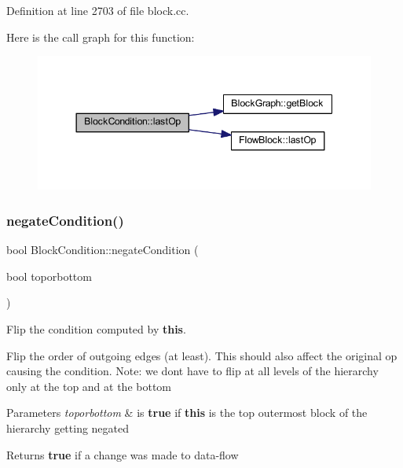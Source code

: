 Definition at line 2703 of file block.\+cc.

Here is the call graph for this function\+:
\nopagebreak
\begin{figure}[H]
\begin{center}
\leavevmode
\includegraphics[width=344pt]{class_block_condition_acfde1060a17a2c40b1cb9edf90e69595_cgraph}
\end{center}
\end{figure}
\mbox{\label{class_block_condition_a2af1221f54ea05c5c8b25b4321f60705}} 
\subsubsection{\texorpdfstring{negateCondition()}{negateCondition()}}
{\footnotesize\ttfamily bool Block\+Condition\+::negate\+Condition (\begin{DoxyParamCaption}\item[{bool}]{toporbottom }\end{DoxyParamCaption})\hspace{0.3cm}{\ttfamily [virtual]}}



Flip the condition computed by {\bfseries{this}}. 

Flip the order of outgoing edges (at least). This should also affect the original op causing the condition. Note\+: we don\textquotesingle{}t have to flip at all levels of the hierarchy only at the top and at the bottom 
\begin{DoxyParams}{Parameters}
{\em toporbottom} & is {\bfseries{true}} if {\bfseries{this}} is the top outermost block of the hierarchy getting negated \\
\hline
\end{DoxyParams}
\begin{DoxyReturn}{Returns}
{\bfseries{true}} if a change was made to data-\/flow 
\end{DoxyReturn}


